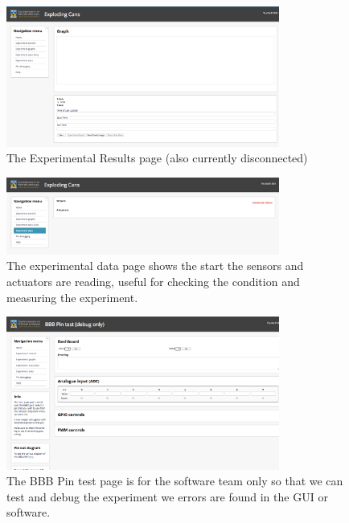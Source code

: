 \begin{figure}[H]
	\centering
	\includegraphics[width=0.8\textwidth]{figures/GUI_results.png}
	\caption{The Experimental Results page (also currently disconnected)} 
\end{figure}

\begin{figure}[H]
	\centering
	\includegraphics[width=0.8\textwidth]{figures/GUI_data.png}
	\caption{The experimental data page shows the start the sensors and actuators are reading, useful for checking the condition and measuring the experiment. } 
\end{figure}

\begin{figure}[H]
	\centering
	\includegraphics[width=0.8\textwidth]{figures/GUI_pintest.png}
	\caption{The BBB Pin test page is for the software team only so that we can test and debug the experiment we errors are found in the GUI or software. } 
\end{figure}

